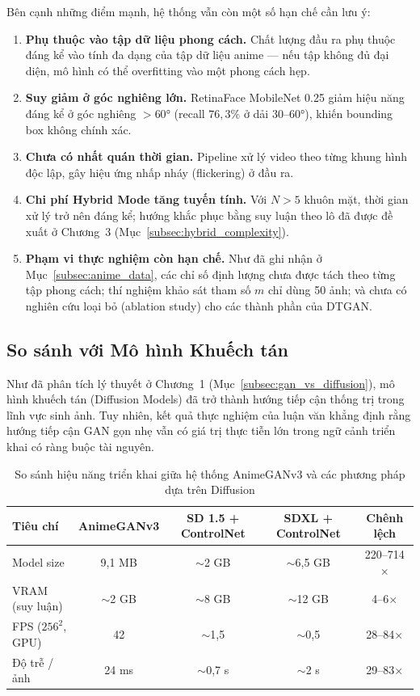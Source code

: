 Bên cạnh những điểm mạnh, hệ thống vẫn còn một số hạn chế cần lưu ý:

\begin{enumerate}
    \item \textbf{Phụ thuộc vào tập dữ liệu phong cách.} Chất lượng đầu ra phụ thuộc đáng kể vào tính đa dạng của tập dữ liệu anime --- nếu tập không đủ đại diện, mô hình có thể overfitting vào một phong cách hẹp.
    \item \textbf{Suy giảm ở góc nghiêng lớn.} RetinaFace MobileNet 0.25 giảm hiệu năng đáng kể ở góc nghiêng $>60°$ (recall $76{,}3\%$ ở dải $30$--$60°$), khiến bounding box không chính xác.
    \item \textbf{Chưa có nhất quán thời gian.} Pipeline xử lý video theo từng khung hình độc lập, gây hiệu ứng nhấp nháy (flickering) ở đầu ra.
    \item \textbf{Chi phí Hybrid Mode tăng tuyến tính.} Với $N > 5$ khuôn mặt, thời gian xử lý trở nên đáng kể; hướng khắc phục bằng suy luận theo lô đã được đề xuất ở Chương~3 (Mục~\ref{subsec:hybrid_complexity}).
    \item \textbf{Phạm vi thực nghiệm còn hạn chế.} Như đã ghi nhận ở Mục~\ref{subsec:anime_data}, các chỉ số định lượng chưa được tách theo từng tập phong cách; thí nghiệm khảo sát tham số $m$ chỉ dùng 50 ảnh; và chưa có nghiên cứu loại bỏ (ablation study) cho các thành phần của DTGAN.
\end{enumerate}

\subsection{So sánh với Mô hình Khuếch tán}
\label{subsec:diffusion_comparison}

Như đã phân tích lý thuyết ở Chương~1 (Mục~\ref{subsec:gan_vs_diffusion}), mô hình khuếch tán (Diffusion Models) đã trở thành hướng tiếp cận thống trị trong lĩnh vực sinh ảnh. Tuy nhiên, kết quả thực nghiệm của luận văn khẳng định rằng hướng tiếp cận GAN gọn nhẹ vẫn có giá trị thực tiễn lớn trong ngữ cảnh triển khai có ràng buộc tài nguyên.

\begin{table}[H]
\caption{So sánh hiệu năng triển khai giữa hệ thống AnimeGANv3 và các phương pháp dựa trên Diffusion}
\label{tab:diffusion_comparison_chap4}
\centering
\begin{tabular}{|p{3cm}|c|c|c|c|}
\hline
\textbf{Tiêu chí} & \textbf{AnimeGANv3} & \textbf{SD 1.5 + ControlNet} & \textbf{SDXL + ControlNet} & \textbf{Chênh lệch} \\
\hline
Model size & 9,1 MB & $\sim$2 GB & $\sim$6,5 GB & 220--714$\times$ \\
\hline
VRAM (suy luận) & $\sim$2 GB & $\sim$8 GB & $\sim$12 GB & 4--6$\times$ \\
\hline
FPS ($256^2$, GPU) & 42 & $\sim$1,5 & $\sim$0,5 & 28--84$\times$ \\
\hline
Độ trễ / ảnh & 24 ms & $\sim$0,7 s & $\sim$2 s & 29--83$\times$ \\
\hline
\end{tabular}
\end{table}

